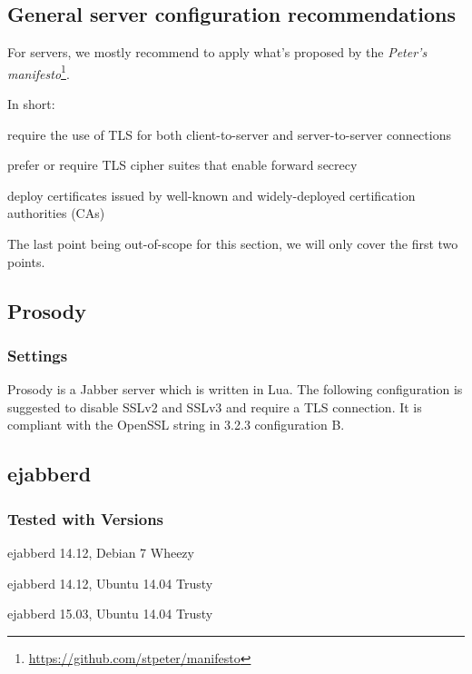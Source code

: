 \gdef\currentsectionname{IM}
\subsection{General server configuration recommendations}

For servers, we mostly recommend to apply what's proposed by the \emph{Peter's manifesto}\footnote{\url{https://github.com/stpeter/manifesto}}.

In short:
\begin{itemize*}
    \item require the use of TLS for both client-to-server and server-to-server connections
    \item prefer or require TLS cipher suites that enable forward secrecy
    \item deploy certificates issued by well-known and widely-deployed certification authorities (CAs)
\end{itemize*}

The last point being out-of-scope for this section, we will only cover the first two points.


\subsection{Prosody}
\subsubsection{Settings}
Prosody is a Jabber server which is written in Lua. 
The following configuration is suggested to disable SSLv2 and SSLv3 and require a TLS connection. It is compliant with the OpenSSL string in 3.2.3 configuration B.




\subsection{ejabberd}

\subsubsection{Tested with Versions}
\begin{itemize*}
  \item ejabberd 14.12, Debian 7 Wheezy
  \item ejabberd 14.12, Ubuntu 14.04 Trusty
  \item ejabberd 15.03, Ubuntu 14.04 Trusty
\end{itemize*}

